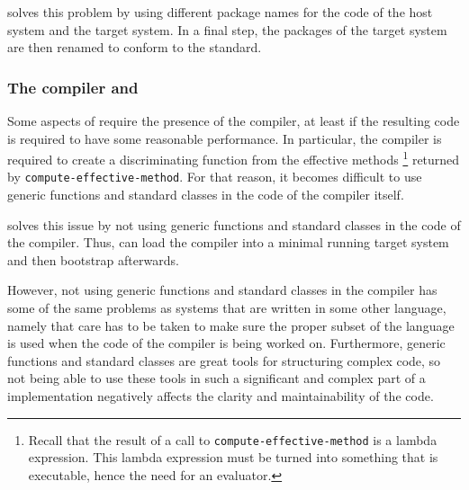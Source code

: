 \sbcl{} solves this problem by using different package names for the
code of the host system and the target system.  In a final step, the
packages of the target system are then renamed to conform to the
standard.

\subsubsection{The compiler and \clos{}}

Some aspects of \clos{} require the presence of the compiler, at least
if the resulting code is required to have some reasonable
performance.  In particular, the compiler is required to create a
discriminating function from the effective methods%
\footnote{Recall that the result of a call to
  \texttt{compute\--effective\--method} is a lambda expression.  This
  lambda expression must be turned into something that is executable,
  hence the need for an evaluator.}
returned by \texttt{compute\--effective\--method}.
For that reason, it becomes difficult to use generic
functions and standard classes in the code of the compiler itself.

\sbcl{} solves this issue by not using generic functions and standard
classes in the code of the compiler.  Thus, \sbcl{} can load the
compiler into a minimal running target system and then bootstrap
\clos{} afterwards.

However, not using generic functions and standard classes in the
compiler has some of the same problems as \commonlisp{} systems that
are written in some other language, namely that care has to be taken
to make sure the proper subset of the language is used when the code
of the compiler is being worked on.  Furthermore, generic functions
and standard classes are great tools for structuring complex code, so
not being able to use these tools in such a significant and complex
part of a \commonlisp{} implementation negatively affects the clarity
and maintainability of the code.
